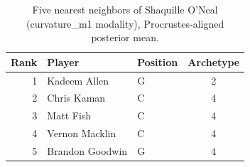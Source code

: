 \begin{table}[htbp]
  \centering\small
  \begin{tabular}{rllc}
    \toprule
    Rank & Player & Position & Archetype \\
    \midrule
    1 & Kadeem Allen & G & 2 \\
    2 & Chris Kaman & C & 4 \\
    3 & Matt Fish & C & 4 \\
    4 & Vernon Macklin & C & 4 \\
    5 & Brandon Goodwin & G & 4 \\
    \bottomrule
  \end{tabular}
  \caption{Five nearest neighbors of Shaquille O'Neal (curvature_m1 modality), Procrustes-aligned posterior mean.}
  \label{tab:Shaquille_O_Neal_neighbors_curvature_m1}
\end{table}

